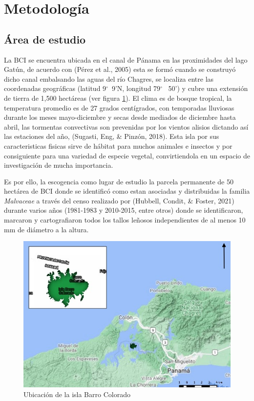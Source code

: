 \documentclass[11pt,]{article}
\begin{document}
\section{Metodología}\label{metodologuxeda}

\subsection{Área de estudio}\label{uxe1rea-de-estudio}

La BCI se encuentra ubicada en el canal de Pánama en las proximidades
del lago Gatún, de acuerdo con (Pérez et al., 2005) esta se formó cuando
se construyó dicho canal embalsando las aguas del río Chagres, se
localiza entre las coordenadas geográficas (latitud 9\(^\circ\)~9'N,
longitud 79\(^\circ\)~ 50') y cubre una extensión de tierra de 1,500
hectáreas (ver figura \ref{mapa}). El clima es de bosque tropical, la
temperatura promedio es de 27 grados centígrados, con temporadas
lluviosas durante los meses mayo-diciembre y secas desde mediados de
diciembre hasta abril, las tormentas convectivas son prevenidas por los
vientos alisios dictando así las estaciones del año, (Sugasti, Eng, \&
Pinzón, 2018). Esta isla por sus caracteristicas fisicas sirve de
hábitat para muchos animales e insectos y por consiguiente para una
variedad de especie vegetal, convirtiendola en un espacio de
investigación de mucha importancia.

Es por ello, la escogencia como lugar de estudio la parcela permanente
de 50 hectárea de BCI donde se identificó como estan asociadas y
distribuidas la familia \emph{Malvaceae} a través del censo realizado
por (Hubbell, Condit, \& Foster, 2021) durante varios años (1981-1983 y
2010-2015, entre otros) donde se identificaron, marcaron y
cartografiaron todos los tallos leñosos independientes de al menos 10 mm
de diámetro a la altura.

\begin{figure}
\centering
\includegraphics{mapa_barro_colorado.jpeg}
\caption{Ubicación de la isla Barro Colorado\label{mapa}}
\end{figure}
\end{document}
